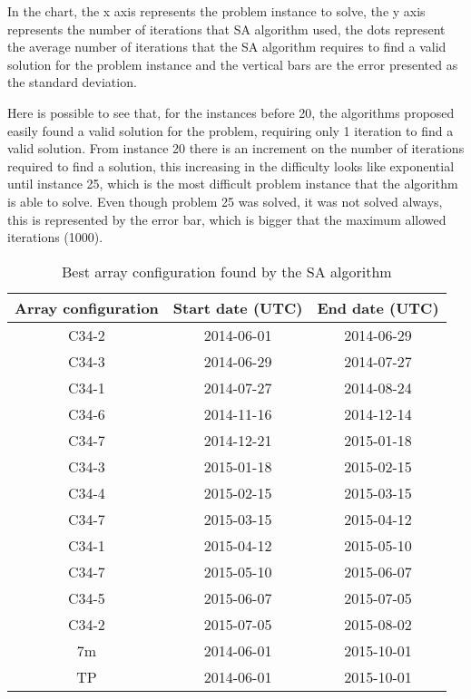 In the chart, the x axis represents the problem instance to solve, the y axis represents the number of iterations that SA algorithm used, the dots represent the average number of iterations that the SA algorithm requires to find a valid solution for the problem instance and the vertical bars are the error presented as the standard deviation. 

Here is possible to see that, for the instances before 20, the algorithms proposed easily found a valid solution for the problem, requiring only 1 iteration to find a valid solution. From instance 20 there is an increment on the number of iterations required to find a solution, this increasing in the difficulty looks like exponential until instance 25, which is the most difficult problem instance that the algorithm is able to solve. Even though problem 25 was solved, it was not solved always, this is represented by the error bar, which is bigger that the maximum allowed iterations (1000).

\begin{table}[htbp]
\begin{center}
\begin{tabular}{|c|c|c|}
\hline
Array configuration & Start date (UTC) & End date (UTC) \\ \hline
C34-2 & 2014-06-01 & 2014-06-29  \\ \hline
C34-3 & 2014-06-29 & 2014-07-27 \\ \hline
C34-1 & 2014-07-27 & 2014-08-24 \\ \hline
C34-6 & 2014-11-16 & 2014-12-14 \\ \hline
C34-7 & 2014-12-21 & 2015-01-18 \\ \hline
C34-3 & 2015-01-18 & 2015-02-15 \\ \hline
C34-4 & 2015-02-15 & 2015-03-15 \\ \hline
C34-7 & 2015-03-15 & 2015-04-12 \\ \hline
C34-1 & 2015-04-12 & 2015-05-10 \\ \hline
C34-7 & 2015-05-10 & 2015-06-07 \\ \hline
C34-5 & 2015-06-07 & 2015-07-05  \\ \hline
C34-2 & 2015-07-05 & 2015-08-02  \\ \hline
7m & 2014-06-01 & 2015-10-01 \\ \hline
TP & 2014-06-01 & 2015-10-01 \\ \hline
\end{tabular}
\end{center}
\caption{Best array configuration found by the SA algorithm}
\label{table:best-arr-conf}
\end{table}

